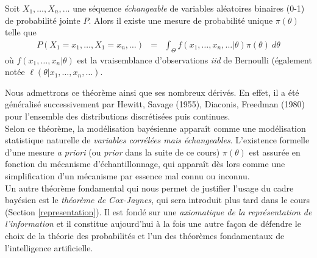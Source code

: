 \begin{theorem}[De Finetti (1931)]
Soit $X_1,\ldots, X_n,\ldots$ une séquence \emph{échangeable} de variables aléatoires binaires (0-1) de probabilité jointe $P$. Alors il existe une mesure de probabilité unique  $\pi(\theta)$ telle que 
\begin{eqnarray*}
P(X_1=x_1,\ldots,X_1=x_n,\ldots) & = & \int_{\Theta} f(x_1,\ldots,x_n,\ldots|\theta) \pi(\theta) \ d \theta
\end{eqnarray*}
où $f(x_1,\dots,x_n|\theta)$ est la vraisemblance d'observations  \emph{iid} de Bernoulli (également notée $\ell(\theta|x_1,\ldots,x_n,\ldots)$.
\end{theorem}

Nous admettrons ce théorème ainsi que ses nombreux dérivés. En effet, il a été généralisé successivement par Hewitt, Savage (1955), Diaconis, Freedman (1980) pour l'ensemble des distributions discrétisées puis continues. \\

Selon ce théorème, la modélisation bayésienne apparaît comme une modélisation statistique naturelle de \emph{variables corrélées mais échangeables}.  L'existence formelle d'une mesure {\it a priori} (ou \emph{prior} dans la suite de ce cours) $\pi(\theta)$ est assurée en fonction du mécanisme d'échantillonnage, qui apparaît dès lors comme une simplification d'un mécanisme par essence mal connu ou inconnu. \\

Un autre théorème fondamental qui nous permet de justifier l'usage du cadre bayésien est le \emph{théorème de Cox-Jaynes}, qui sera introduit plus tard dans le cours (Section \ref{representation}). Il est fondé sur une \emph{axiomatique de la représentation de l'information} et il constitue aujourd'hui à la fois une autre fa\c con de défendre le choix de la théorie des probabilités et l'un des théorèmes fondamentaux de l'intelligence artificielle.\\

